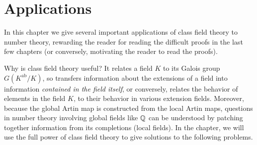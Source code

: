 \chapter{Applications}
In this chapter we give several important applications of class field theory to number theory, rewarding the reader for reading the difficult proofs in the last few chapters (or conversely, motivating the reader to read the proofs).

Why is class field theory useful? It relates a field $K$ to its Galois group $G(K^{\text{ab}}/K)$, so transfers information about the extensions of a field into information {\it contained in the field itself}, or conversely, relates the behavior of elements in the field $K$, to their behavior in various extension fields. Moreover, because the global Artin map is constructed from the local Artin maps, questions in number theory involving global fields like $\mathbb{Q}$ can be understood by patching together information from its completions (local fields). In the chapter, we will use the full power of class field theory to give solutions to the following problems.

